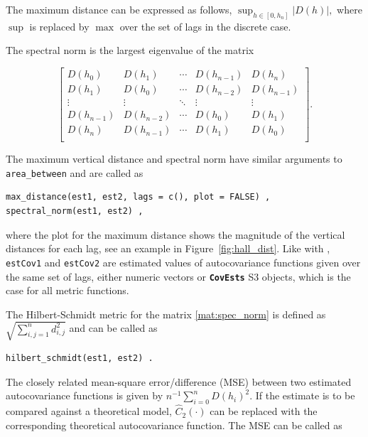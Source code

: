 The maximum distance can be expressed as follows,
\(\sup_{h \in [0, h_{n}]} \left| D(h) \right| ,\) where \(\sup\) is
replaced by \(\max\) over the set of lags in the discrete case.

The spectral norm is the largest eigenvalue of the matrix

\begin{equation}
\begin{bmatrix} \label{mat:spec_norm}
D(h_{0})     & D(h_{1})     & \cdots & D(h_{n - 1}) & D(h_{n})     \\
D(h_{1})     & D(h_{0})     & \cdots & D(h_{n - 2}) & D(h_{n - 1}) \\
\vdots       & \vdots       & \ddots & \vdots       & \vdots       \\
D(h_{n - 1}) & D(h_{n - 2}) & \cdots & D(h_{0})     & D(h_{1})     \\
D(h_{n})     & D(h_{n - 1}) & \cdots & D(h_{1})     & D(h_{0})     \\
\end{bmatrix}  .
\end{equation}

The maximum vertical distance and spectral norm have similar arguments
to \texttt{area\_between} and are called as

\begin{verbatim}
max_distance(est1, est2, lags = c(), plot = FALSE) ,
spectral_norm(est1, est2) ,
\end{verbatim}

where the plot for the maximum distance shows the magnitude of the
vertical distances for each lag, see an example in
Figure~\ref{fig:hall_dist}. Like with ,
\texttt{estCov1} and \texttt{estCov2} are estimated values of
autocovariance functions given over the same set of lags, either numeric
vectors or \textbf{\texttt{CovEsts}} S3 objects, which is the case for
all metric functions.

The Hilbert-Schmidt metric for the matrix \eqref{mat:spec_norm} is
defined as \(\sqrt{\sum_{i,j= 1}^{n} d_{i,j}^{2}}\) and can be called as

\begin{verbatim}
hilbert_schmidt(est1, est2) .
\end{verbatim}

The closely related mean-square error/difference (MSE) between two
estimated autocovariance functions is given by
\(n^{-1} \sum_{i = 0}^{n} D(h_{i})^{2} .\) If the estimate is to be
compared against a theoretical model, \(\widehat{C}_{2}(\cdot)\) can be
replaced with the corresponding theoretical autocovariance function. The
MSE can be called as

